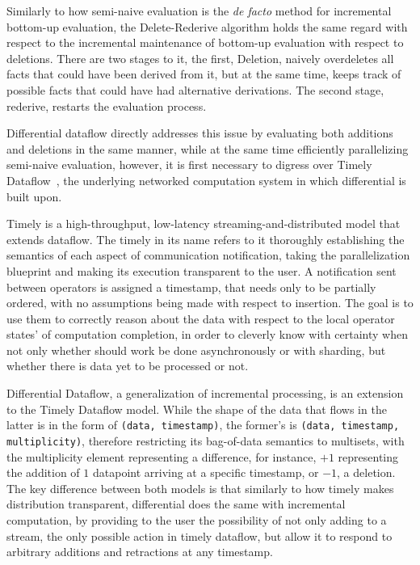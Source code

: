 \documentclass[sigconf,screen,review,natbib]{acmart}
\theoremstyle{definition}
\begin{document}
Similarly to how semi-naive evaluation is the \textit{de facto} method for incremental bottom-up evaluation, the Delete-Rederive\cite{dred} algorithm holds
the same regard with respect to the incremental maintenance of bottom-up evaluation with respect to deletions. There are two stages to it, the first, Deletion,
naively overdeletes all facts that could have been derived from it, but at the same time, keeps track of possible facts that could have had alternative
derivations. The second stage, rederive, restarts the evaluation process.

Differential dataflow directly addresses this issue by evaluating both additions and deletions in the same manner, while at the same time efficiently parallelizing
semi-naive evaluation, however, it is first necessary to digress over Timely Dataflow~\cite{timely}, the underlying networked computation system in which differential
is built upon.

Timely is a high-throughput, low-latency streaming-and-distributed model that extends dataflow. The timely in its name refers to it thoroughly establishing
the semantics of each aspect of communication notification, taking the parallelization blueprint and making its execution transparent to the user. A notification
sent between operators is assigned a timestamp, that needs only to be partially ordered, with no assumptions being made with respect to insertion. The goal is to use
them to correctly reason about the data with respect to the local operator states' of computation completion, in order to cleverly know with certainty when not only
whether should work be done asynchronously or with sharding, but whether there is data yet to be processed or not.

Differential Dataflow, a generalization of incremental processing, is an extension to the Timely Dataflow model. While the shape of the data that flows in the latter is
in the form of \verb|(data, timestamp)|, the former's is \verb|(data, timestamp, multiplicity)|, therefore restricting its bag-of-data semantics to multisets, with
the multiplicity element representing a difference, for instance, $+1$ representing the addition of $1$ datapoint arriving at a specific timestamp, or $-1$, a deletion. The
key difference between both models is that similarly to how timely makes distribution transparent, differential does the same with incremental computation, by providing to the
user the possibility of not only adding to a stream, the only possible action in timely dataflow, but allow it to respond to arbitrary additions and retractions at any timestamp.
\end{document}
